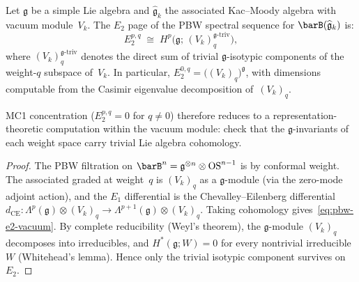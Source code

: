 \begin{proposition}\label{prop:pbw-e2-from-vacuum-module}
Let $\mathfrak{g}$ be a simple Lie algebra and
$\widehat{\mathfrak{g}}_k$ the associated Kac--Moody algebra
with vacuum module~$V_k$.
The $E_2$ page of the PBW spectral sequence for
$\barB(\widehat{\mathfrak{g}}_k)$ is:
\begin{equation}\label{eq:pbw-e2-vacuum}
E_2^{p,q}
\;\cong\;
H^p\!\bigl(\mathfrak{g};\,
(V_k)_q^{\mathfrak{g}\text{-}\mathrm{triv}}\bigr),
\end{equation}
where $(V_k)_q^{\mathfrak{g}\text{-}\mathrm{triv}}$
denotes the direct sum of trivial $\mathfrak{g}$-isotypic
components of the weight-$q$ subspace of~$V_k$.
In particular, $E_2^{0,q} =
\bigl((V_k)_q\bigr)^{\mathfrak{g}}$, with dimensions
computable from the Casimir eigenvalue decomposition
of~$(V_k)_q$.

MC1 concentration ($E_2^{p,q} = 0$ for $q \neq 0$) therefore
reduces to a representation-theoretic computation within the
vacuum module: check that the $\mathfrak{g}$-invariants of each
weight space carry trivial Lie algebra cohomology.
\end{proposition}

\begin{proof}
The PBW filtration on
$\barB^n = \mathfrak{g}^{\otimes n} \otimes \mathrm{OS}^{n-1}$
is by conformal weight. The associated graded at weight~$q$ is
$(V_k)_q$ as a $\mathfrak{g}$-module (via the zero-mode adjoint
action), and the $E_1$ differential is the Chevalley--Eilenberg
differential $d_{\mathrm{CE}} \colon
\Lambda^p(\mathfrak{g}) \otimes (V_k)_q \to
\Lambda^{p+1}(\mathfrak{g}) \otimes (V_k)_q$.
Taking cohomology gives~\eqref{eq:pbw-e2-vacuum}.
By complete reducibility (Weyl's theorem), the $\mathfrak{g}$-module
$(V_k)_q$ decomposes into irreducibles, and
$H^*(\mathfrak{g}; W) = 0$ for every nontrivial irreducible~$W$
(Whitehead's lemma). Hence only the trivial isotypic component
survives on~$E_2$.
\end{proof}


